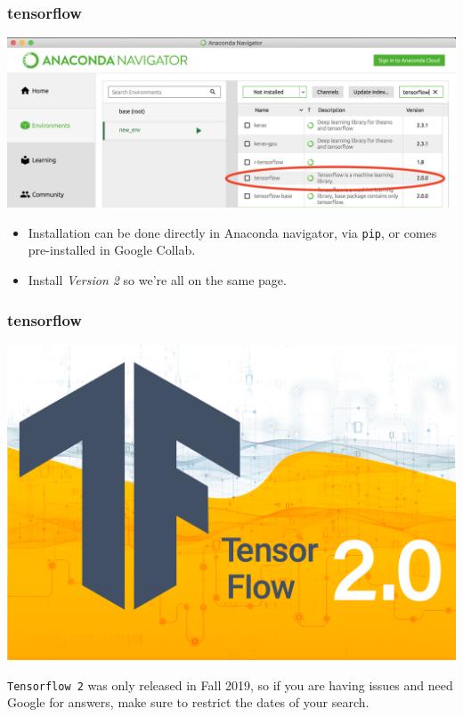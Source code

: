 \documentclass[handout,compress]{beamer}
\begin{document}
\begin{frame}
	\frametitle{tensorflow}	
	\begin{center}
		\includegraphics[width=\textwidth]{tensorflow_install.png}
	\end{center}
\begin{itemize}
	\item Installation can be done directly in Anaconda navigator, via \texttt{pip}, or comes pre-installed in Google Collab.
	\item Install \emph{Version 2} so we're all on the same page. 
\end{itemize}
\end{frame}

\begin{frame}
	\frametitle{tensorflow}
	\begin{center}
				\includegraphics[width=.5\textwidth]{tf2.png}
	\end{center}	
	\texttt{Tensorflow 2} was only released in Fall 2019, so if you are having issues and need Google for answers, make sure to restrict the dates of your search. 
\end{frame}
\end{document}
